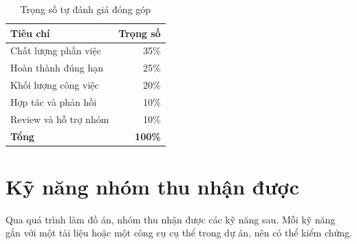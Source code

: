 \documentclass[12pt,a4paper]{article}
\begin{document}
\begin{table}[H]
  \centering
  \small
  \caption{Trọng số tự đánh giá đóng góp}
  \begin{tabular}{lr}
    \toprule
    \textbf{Tiêu chí} & \textbf{Trọng số} \\
    \midrule
    Chất lượng phần việc & 35\% \\
    Hoàn thành đúng hạn & 25\% \\
    Khối lượng công việc & 20\% \\
    Hợp tác và phản hồi & 10\% \\
    Review và hỗ trợ nhóm & 10\% \\
    \textbf{Tổng} & \textbf{100\%} \\
    \bottomrule
  \end{tabular}
\end{table}
\section{Kỹ năng nhóm thu nhận được}

Qua quá trình làm đồ án, nhóm thu nhận được các kỹ năng sau. Mỗi kỹ năng gắn với
một tài liệu hoặc một công cụ cụ thể trong dự án, nên có thể kiểm chứng.
\end{document}
